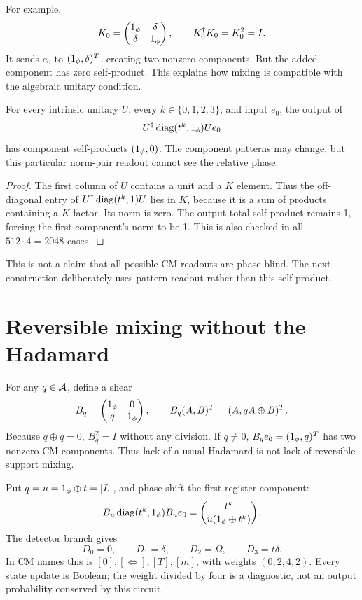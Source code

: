 For example,
\begin{equation}\label{eq:Kgate}
 K_0=\begin{pmatrix}1_{\phi}&\delta\\\delta&1_{\phi}\end{pmatrix},\qquad K_0^\dagger K_0=K_0^2=I.
\end{equation}
It sends $e_0$ to $(1_{\phi},\delta)^T$, creating two nonzero components. But the added component has zero self-product. This explains how mixing is compatible with the algebraic unitary condition.

\begin{proposition}\label{prop:unitaryblind}
For every intrinsic unitary $U$, every $k\in\{0,1,2,3\}$, and input $e_0$, the output of
\begin{equation}
 U^\dagger\operatorname{diag}(t^k,1_{\phi})Ue_0
\end{equation}
has component self-products $(1_{\phi},0)$. The component patterns may change, but this particular norm-pair readout cannot see the relative phase.
\end{proposition}
\begin{proof}
The first column of $U$ contains a unit and a $K$ element. Thus the off-diagonal entry of $U^\dagger\operatorname{diag}(t^k,1)U$ lies in $K$, because it is a sum of products containing a $K$ factor. Its norm is zero. The output total self-product remains 1, forcing the first component's norm to be 1. This is also checked in all $512\cdot4=2048$ cases.
\end{proof}
This is not a claim that all possible CM readouts are phase-blind. The next construction deliberately uses pattern readout rather than this self-product.

\section{Reversible mixing without the Hadamard}\label{sec:shears}
For any $q\in\mathcal A$, define a shear
\begin{equation}\label{eq:shear}
 B_q=\begin{pmatrix}1_{\phi}&0\\q&1_{\phi}\end{pmatrix},\qquad B_q(A,B)^T=(A,qA\oplus B)^T.
\end{equation}
Because $q\oplus q=0$, $B_q^2=I$ without any division. If $q\ne0$, $B_qe_0=(1_{\phi},q)^T$ has two nonzero CM components. Thus lack of a usual Hadamard is not lack of reversible support mixing.

Put $q=u=1_{\phi}\oplus t=[L]$, and phase-shift the first register component:
\begin{equation}\label{eq:shearphase}
 B_u\operatorname{diag}(t^k,1_{\phi})B_ue_0
 =\binom{t^k}{u(1_{\phi}\oplus t^k)}.
\end{equation}
The detector branch gives
\begin{equation}\label{eq:shearoutputs}
 D_0=0,\qquad D_1=\delta,\qquad D_2=\Omega,\qquad D_3=t\delta.
\end{equation}
In CM names this is $[0],[\Leftrightarrow],[T],[m]$, with weights $(0,2,4,2)$. Every state update is Boolean; the weight divided by four is a diagnostic, not an output probability conserved by this circuit.

